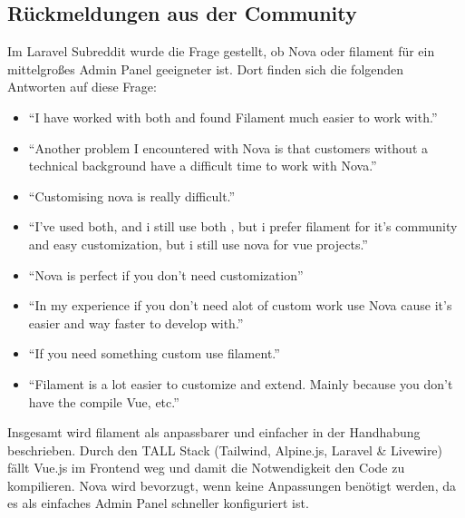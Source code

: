 \subsection{Rückmeldungen aus der Community}
Im Laravel Subreddit wurde die Frage gestellt, ob Nova oder filament für ein mittelgroßes Admin Panel geeigneter ist\cite{reddit-laravel-nova-vs-filament}.
Dort finden sich die folgenden Antworten auf diese Frage:

\begin{itemize}
    \item \enquote{I have worked with both and found Filament much easier to work with.}
    \item \enquote{Another problem I encountered with Nova is that customers without a technical background have a difficult time to work with Nova.}
    \item \enquote{Customising nova is really difficult.}
    \item \enquote{I've used both, and i still use both , but i prefer filament for it's community and easy customization, but i still use nova for vue projects.}
    \item \enquote{Nova is perfect if you don't need customization}
    \item \enquote{In my experience if you don’t need alot of custom work use Nova cause it’s easier and way faster to develop with.}
    \item \enquote{If you need something custom use filament.}
    \item \enquote{Filament is a lot easier to customize and extend. Mainly because you don’t have the compile Vue, etc.}
\end{itemize}

Insgesamt wird filament als anpassbarer und einfacher in der Handhabung beschrieben.
Durch den TALL Stack (Tailwind, Alpine.js, Laravel \& Livewire) fällt Vue.js im Frontend weg und damit die Notwendigkeit den Code zu kompilieren.
Nova wird bevorzugt, wenn keine Anpassungen benötigt werden, da es als einfaches Admin Panel schneller konfiguriert ist.
